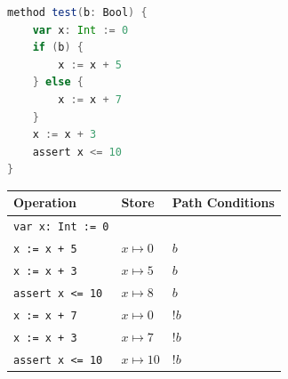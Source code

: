 \documentclass[11pt]{article}
\begin{document}
    \begin{lstlisting}[language=Scala, caption={An example Viper program.}, label={lst:viper-example}]
method test(b: Bool) {
    var x: Int := 0
    if (b) {
        x := x + 5
    } else {
        x := x + 7
    }
    x := x + 3
    assert x <= 10
}       
    \end{lstlisting}

    \begin{center}
        \begin{tabular}{ l|l|l }
            Operation & Store & Path Conditions \\
            \hline
            \texttt{var x: Int := 0} & & \\
            \hdashline
            \texttt{x := x + 5} & $x \mapsto 0$ & $b$ \\
            \texttt{x := x + 3} & $x \mapsto 5$ & $b$ \\
            \texttt{assert x <= 10} & $x \mapsto 8$ & $b$ \\
            \hdashline
            \texttt{x := x + 7} & $x \mapsto 0$ & $!b$ \\
            \texttt{x := x + 3} & $x \mapsto 7$ & $!b$ \\
            \texttt{assert x <= 10} & $x \mapsto 10$ & $!b$ \\
        \end{tabular}
    \end{center}
\end{document}

